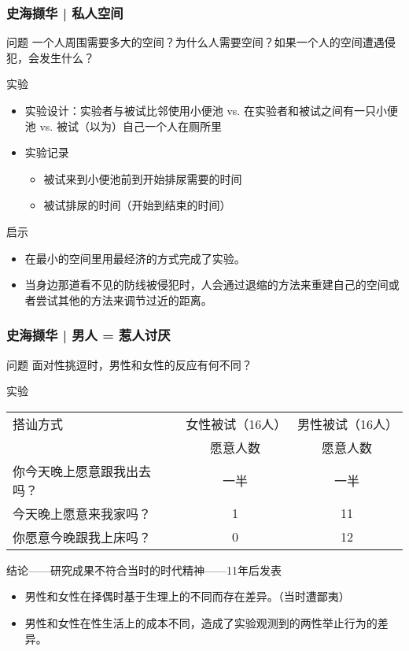 \begin{frame}
  \frametitle{史海撷华 | 私人空间}
  \begin{block}{问题}
      一个人周围需要多大的空间？为什么人需要空间？如果一个人的空间遭遇侵犯，会发生什么？
  \end{block}
  \vspace{-0.3em}
  \pause
  \begin{block}{实验}
    \begin{itemize}
      \item 实验设计：实验者与被试比邻使用小便池 vs. 在实验者和被试之间有一只小便池 vs. 被试（以为）自己一个人在厕所里
      \item 实验记录
        \begin{itemize}
          \item 被试来到小便池前到开始排尿需要的时间
          \item 被试排尿的时间（开始到结束的时间）
        \end{itemize}
    \end{itemize}
  \end{block}
  \vspace{-0.3em}
  \pause
  \begin{block}{启示}
    \begin{itemize}
      \item 在最小的空间里用最经济的方式完成了实验。
      \item 
 当身边那道看不见的防线被侵犯时，人会通过退缩的方法来重建自己的空间或者尝试其他的方法来调节过近的距离。
    \end{itemize}
  \end{block}
\end{frame}

\begin{frame}
  \frametitle{史海撷华 | 男人 = 惹人讨厌}
  \begin{block}{问题}
    面对性挑逗时，男性和女性的反应有何不同？
  \end{block}
  \pause
  \begin{block}{实验}
  \begin{tabular}{lcc}
    \hline
    搭讪方式 & 女性被试（16人） & 男性被试（16人）\\
    & 愿意人数 & 愿意人数\\
    \hline
    你今天晚上愿意跟我出去吗？ & 一半 & 一半\\
    今天晚上愿意来我家吗？ & 1 & 11\\
    你愿意今晚跟我上床吗？ & 0 & 12\\
    \hline
  \end{tabular}
  \end{block}
  \pause
  \begin{block}{结论——研究成果不符合当时的时代精神——11年后发表}
    \begin{itemize}
      \item 男性和女性在择偶时基于生理上的不同而存在差异。（当时遭鄙夷）
      \item 男性和女性在性生活上的成本不同，造成了实验观测到的两性举止行为的差异。
    \end{itemize}
  \end{block}
\end{frame}

